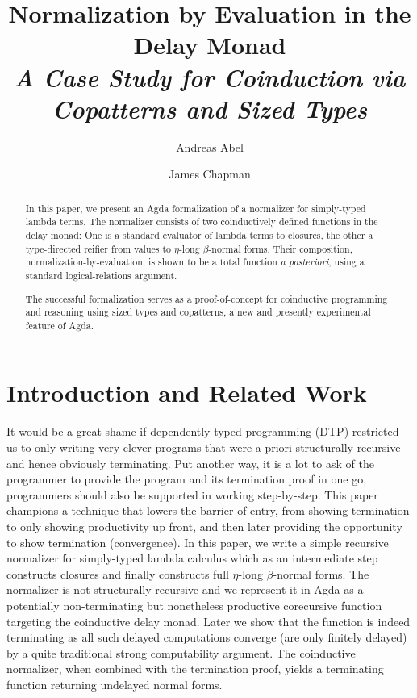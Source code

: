 \documentclass[preliminary,copyright,creativecommons]{eptcs}
\title{Normalization by Evaluation in the Delay Monad \\
  \Large{\emph{A Case Study for Coinduction via Copatterns and Sized Types}}}
\author{Andreas Abel
\institute{Department of Computer Science and Engineering\\
Chalmers and Gothenburg University\\
Sweden}
\email{andreas.abel@gu.se}
\and
James Chapman
\institute{Institute of Cybernetics\\
Tallinn University of Technology\\
Estonia}
\email{james@cs.ioc.ee}
}
\begin{document}
\maketitle
\begin{abstract}

In this paper, we present an Agda formalization of a normalizer for
simply-typed lambda terms.
The normalizer consists of two
coinductively defined functions in the delay monad:
One is a standard evaluator of lambda terms to closures, the other a
type-directed reifier from values to $\eta$-long $\beta$-normal forms.
Their composition,
normalization-by-evaluation, is shown to be a total function \emph{a
posteriori}, using a
standard logical-relations argument.

The successful formalization serves as a proof-of-concept for
coinductive programming and reasoning using sized types and copatterns,
a new and presently experimental feature of Agda.

\end{abstract}

\section{Introduction and Related Work}

It would be a great shame if dependently-typed programming (DTP)
restricted us to only writing very clever programs that were a priori
structurally recursive and hence obviously terminating. Put
another way, it is a lot to ask of the programmer to provide the
program and its termination proof in one go, programmers should also
be supported in working step-by-step. This paper champions a technique
that lowers the barrier of entry, from showing termination to only
showing productivity up front, and then later providing the
opportunity to show termination (convergence). In this paper, we write
a simple recursive normalizer for simply-typed lambda calculus which
as an intermediate step constructs closures
and finally constructs full $\eta$-long $\beta$-normal forms. The normalizer
is not structurally recursive and we represent it in Agda as a
potentially non-terminating but nonetheless productive corecursive
function targeting the coinductive delay monad. Later we show that the function
is indeed terminating as all such delayed computations converge (are
only finitely delayed) by a quite traditional strong computability
argument. The coinductive normalizer, when combined with the
termination proof, yields a terminating function returning undelayed
normal forms.
\end{document}
